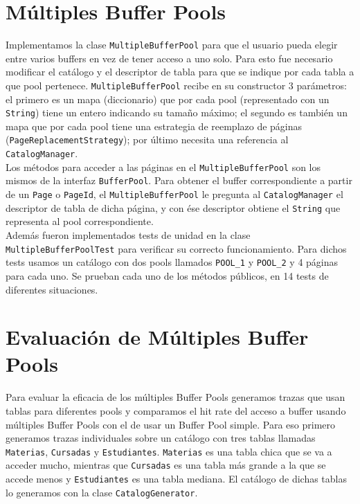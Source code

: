 \documentclass[a4paper,10pt]{article}
\begin{document}
\section{Múltiples Buffer Pools}
Implementamos la clase \texttt{MultipleBufferPool} para que el usuario pueda elegir entre varios buffers en vez de tener acceso a uno solo. Para esto fue necesario modificar el catálogo y el descriptor de tabla para que se indique por cada tabla a que pool pertenece. \texttt{MultipleBufferPool} recibe en su constructor 3 parámetros: el primero es un mapa (diccionario) que por cada pool (representado con un \texttt{String}) tiene un entero indicando su tamaño máximo; el segundo es también un mapa que por cada pool tiene una estrategia de reemplazo de páginas (\texttt{PageReplacementStrategy}); por último necesita una referencia al \texttt{CatalogManager}.\\

Los métodos para acceder a las páginas en el \texttt{MultipleBufferPool} son los mismos de la interfaz \texttt{BufferPool}. Para obtener el buffer correspondiente a partir de un \texttt{Page} o \texttt{PageId}, el \texttt{MultipleBufferPool} le pregunta al \texttt{CatalogManager} el descriptor de tabla de dicha página, y con ése descriptor obtiene el \texttt{String} que representa al pool correspondiente.\\

Además fueron implementados tests de unidad en la clase \texttt{MultipleBufferPoolTest} para verificar su correcto funcionamiento. Para dichos tests usamos un catálogo con dos pools llamados \texttt{POOL\_1} y \texttt{POOL\_2} y 4 páginas para cada uno. Se prueban cada uno de los métodos públicos, en 14 tests de diferentes situaciones.

\newpage

\section{Evaluación de Múltiples Buffer Pools}

Para evaluar la eficacia de los m\'ultiples Buffer Pools generamos trazas que usan tablas para diferentes pools y comparamos el hit rate del acceso a buffer usando m\'ultiples Buffer Pools con el de usar un Buffer Pool simple. Para eso primero generamos trazas individuales sobre un cat\'alogo con tres tablas llamadas \texttt{Materias}, \texttt{Cursadas} y \texttt{Estudiantes}. \texttt{Materias} es una tabla chica que se va a acceder mucho, mientras que \texttt{Cursadas} es una tabla m\'as grande a la que se accede menos y \texttt{Estudiantes} es una tabla mediana. El cat\'alogo de dichas tablas lo generamos con la clase \texttt{CatalogGenerator}.\\
\end{document}
